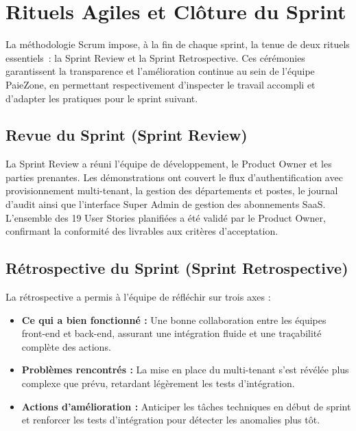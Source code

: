 \section{Rituels Agiles et Clôture du Sprint}
\label{sec:s1-rituels}
La méthodologie Scrum impose, à la fin de chaque sprint, la tenue de deux rituels 
essentiels~: la Sprint Review et la Sprint Retrospective. Ces cérémonies garantissent 
la transparence et l'amélioration continue au sein de l'équipe PaieZone, en 
permettant respectivement d'inspecter le travail accompli et d'adapter les pratiques 
pour le sprint suivant.

\subsection{Revue du Sprint (Sprint Review)}

La Sprint Review a réuni l'équipe de développement, le Product Owner et les parties
prenantes. Les démonstrations ont couvert le flux d'authentification avec provisionnement
multi-tenant, la gestion des départements et postes, le journal d'audit ainsi que
l'interface Super Admin de gestion des abonnements SaaS. L'ensemble des 19 User Stories
planifiées a été validé par le Product Owner, confirmant la conformité des livrables
aux critères d'acceptation.

\subsection{Rétrospective du Sprint (Sprint Retrospective)}

La rétrospective a permis à l'équipe de réfléchir sur trois axes :

\begin{itemize}
    \item \textbf{Ce qui a bien fonctionné :}
    Une bonne collaboration entre les équipes front-end et back-end, assurant
    une intégration fluide et une traçabilité complète des actions.

    \item \textbf{Problèmes rencontrés :}
    La mise en place du multi-tenant s'est révélée plus complexe que prévu,
    retardant légèrement les tests d'intégration.

    \item \textbf{Actions d'amélioration :}
    Anticiper les tâches techniques en début de sprint et renforcer
    les tests d'intégration pour détecter les anomalies plus tôt.
\end{itemize}

